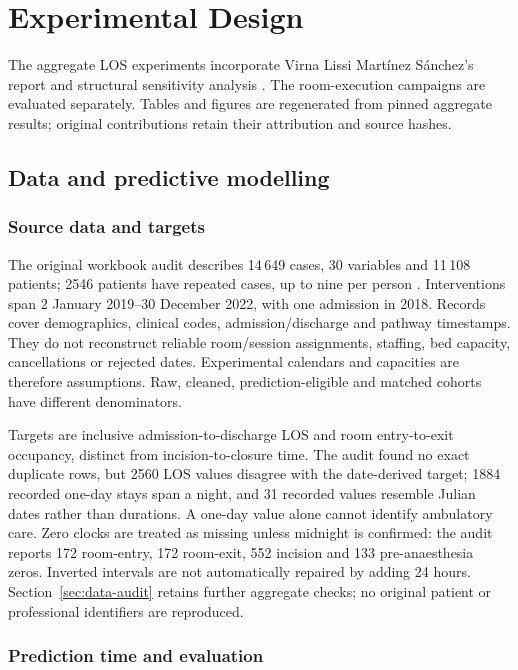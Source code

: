 \section{Experimental Design}
\label{sec:experimental-design}

The aggregate LOS experiments incorporate Virna Lissi Mart\'inez S\'anchez's
report and structural sensitivity analysis \citep{martinez2026los}. The
room-execution campaigns are evaluated separately. Tables and figures are
regenerated from pinned aggregate results; original contributions retain
their attribution and source hashes.

\subsection{Data and predictive modelling}
\label{sec:data-prediction}

\subsubsection{Source data and targets}

The original workbook audit describes 14\,649 cases, 30 variables and
11\,108 patients; 2546 patients have repeated cases, up to nine per person
\citep{group2026dataaudit}. Interventions span 2 January 2019--30 December
2022, with one admission in 2018. Records cover demographics, clinical codes,
admission/discharge and pathway timestamps. They do not reconstruct reliable
room/session assignments, staffing, bed capacity, cancellations or rejected
dates. Experimental calendars and capacities are therefore assumptions.
Raw, cleaned, prediction-eligible and matched cohorts have different denominators.

Targets are inclusive admission-to-discharge LOS and room entry-to-exit
occupancy, distinct from incision-to-closure time. The audit found no exact
duplicate rows, but 2560 LOS values disagree with the date-derived target;
1884 recorded one-day stays span a night, and 31 recorded values resemble
Julian dates rather than durations. A one-day value alone cannot identify
ambulatory care. Zero clocks are treated as missing unless midnight is
confirmed: the audit reports 172 room-entry, 172 room-exit, 552 incision and
133 pre-anaesthesia zeros. Inverted intervals are not automatically repaired
by adding 24 hours. Section~\ref{sec:data-audit} retains further aggregate
checks; no original patient or professional identifiers are reproduced.

\subsubsection{Prediction time and evaluation}

